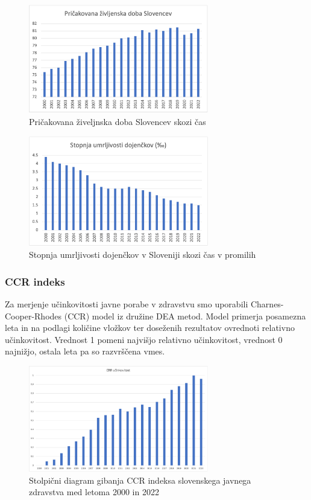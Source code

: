 \documentclass[12pt,a4paper]{article}
\theoremstyle{definition}
\begin{document}
\begin{figure}[H]
    \centering
    \includegraphics[width=0.7\textwidth]{pricak_zivlj_slo.png}
    \caption{Pričakovana živeljnska doba Slovencev skozi čas}
    \label{fig:pricak_zivlj_slo.png}
  \end{figure}

  \begin{figure}[H]
    \centering
    \includegraphics[width=0.7\textwidth]{umrljivost_doj_slo.png}
    \caption{Stopnja umrljivosti dojenčkov v Sloveniji skozi čas v promilih}
    \label{fig:umrljivost_doj_slo.png}
  \end{figure}

\subsubsection{CCR indeks}

  Za merjenje učinkovitosti javne porabe v zdravstvu smo uporabili Charnes-Cooper-Rhodes (CCR) model iz družine DEA metod. 
  Model primerja posamezna leta in na podlagi količine vložkov ter doseženih rezultatov ovrednoti relativno učinkovitost. 
  Vrednost 1 pomeni najvišjo relativno učinkovitost, vrednost 0 najnižjo, ostala leta pa so razvrščena vmes.

\begin{figure}[H]
    \centering
    \includegraphics[width=0.7\textwidth]{CRR_stolpicni_slo.png}
    \caption{Stolpični diagram gibanja CCR indeksa slovenskega javnega zdravstva med letoma 2000 in 2022}
    \label{fig:CRR_stolpicni_slo.png}
  \end{figure}
\end{document}
